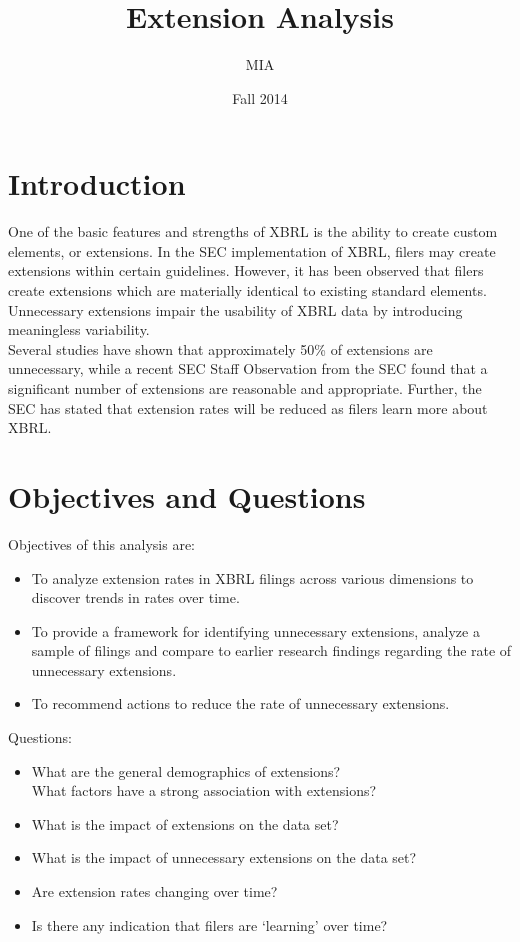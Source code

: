 \documentclass{article}
\title{Extension Analysis}
\author{MIA}
\date{Fall 2014}
\begin{document}











\maketitle

\tableofcontents

\newpage
\section{Introduction}
\noindent One of the basic features and strengths of XBRL is the ability to create custom elements, or extensions. In the SEC implementation of XBRL, filers may create extensions within certain guidelines. However, it has been observed that filers create extensions which are materially identical to existing standard elements. Unnecessary extensions impair the usability of XBRL data by introducing meaningless variability.\\
\noindent Several studies have shown that approximately 50\% of extensions are unnecessary, while a recent SEC Staff Observation from the SEC found that a significant number of extensions are reasonable and appropriate. Further, the SEC has stated that extension rates will be reduced as filers learn more about XBRL.



\section{Objectives and Questions}
Objectives of this analysis are:
\begin{itemize}
\item To analyze extension rates in XBRL filings across various dimensions to discover trends in rates over time. 
\item To provide a framework for identifying unnecessary extensions, analyze a sample of filings and compare to earlier research findings regarding the rate of unnecessary extensions.
\item To recommend actions to reduce the rate of unnecessary extensions.
\end{itemize}

\noindent Questions:
\begin{itemize}
\item What are the general demographics of extensions?\\
What factors have a strong association with extensions?
\item What is the impact of extensions on the data set?
\item What is the impact of unnecessary extensions on the data set?
\item Are extension rates changing over time?
\item Is there any indication that filers are ‘learning’ over time?
\end{itemize}
\end{document}
